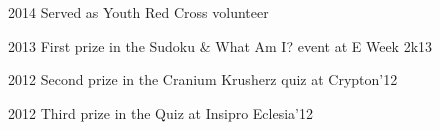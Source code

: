 
\begin{cvachievements}

  \cvachievement
    {2014} %
    {Served as Youth Red Cross volunteer} %
    
  \cvachievement
    {2013} %
    {First prize in the Sudoku \& What Am I? event at E Week 2k13} %
    
  \cvachievement
    {2012} %
    {Second prize in the Cranium Krusherz quiz at Crypton'12} %

  \cvachievement
    {2012} %
    {Third prize in the Quiz at Insipro Eclesia'12} %

\end{cvachievements}
